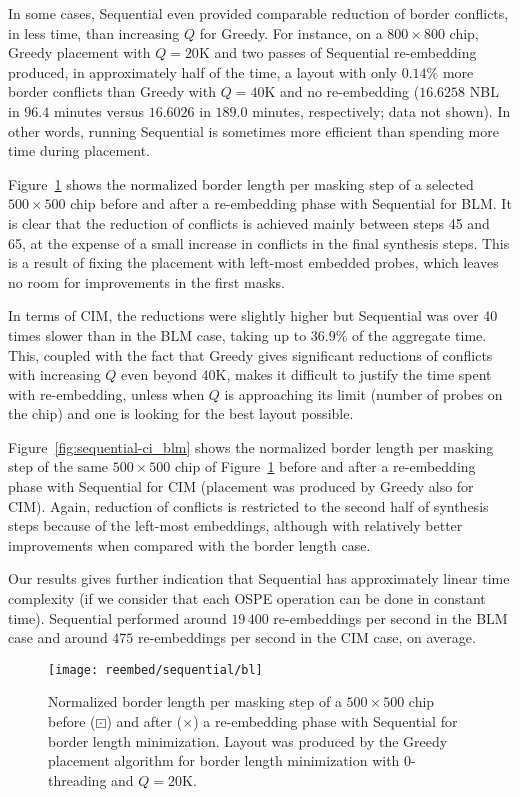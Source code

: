 In some cases, Sequential even provided comparable reduction of border
conflicts, in less time, than increasing $Q$ for Greedy. For instance, on a
$800\times 800$ chip, Greedy placement with $Q=20$K and two passes of Sequential
re-embedding produced, in approximately half of the time, a layout with only
$0.14\%$ more border conflicts than Greedy with $Q=40$K and no re-embedding
($16.6258$ NBL in $96.4$ minutes versus $16.6026$ in $189.0$ minutes,
respectively; data not shown). In other words, running Sequential is sometimes
more efficient than spending more time during placement.

Figure~\ref{fig:sequential-bl_blm} shows the normalized border length per
masking step of a selected $500\times 500$ chip before and after a re-embedding
phase with Sequential for BLM. It is clear that the reduction of conflicts is
achieved mainly between steps 45 and 65, at the expense of a small increase in
conflicts in the final synthesis steps. This is a result of fixing the placement
with left-most embedded probes, which leaves no room for improvements in the
first masks.

In terms of CIM, the reductions were slightly higher but Sequential was over 40
times slower than in the BLM case, taking up to $36.9\%$ of the aggregate time.
This, coupled with the fact that Greedy gives significant reductions of
conflicts with increasing $Q$ even beyond 40K, makes it difficult to justify the
time spent with re-embedding, unless when $Q$ is approaching its limit (number
of probes on the chip) and one is looking for the best layout possible.

Figure~\ref{fig:sequential-ci_blm} shows the normalized border length per
masking step of the same $500\times 500$ chip of
Figure~\ref{fig:sequential-bl_blm} before and after a re-embedding phase with
Sequential for CIM (placement was produced by Greedy also for CIM). Again,
reduction of conflicts is restricted to the second half of synthesis steps
because of the left-most embeddings, although with relatively better
improvements when compared with the border length case.

Our results gives further indication that Sequential has approximately linear
time complexity (if we consider that each OSPE operation can be done in constant
time). Sequential performed around $19\,400$ re-embeddings per second in the BLM
case and around $475$ re-embeddings per second in the CIM case, on average.

\begin{figure}[t]\centering
\texttt{[image: reembed/sequential/bl]}
\caption{\label{fig:sequential-bl_blm}
  Normalized border length per masking step of a $500\times 500$ chip before
  ({\tiny $\boxdot$}) and after ({\tiny $\times$}) a re-embedding phase with
  Sequential for border length minimization. Layout was produced by the Greedy
  placement algorithm for border length minimization with $0$-threading and
  $Q=20$K.}
\end{figure}

